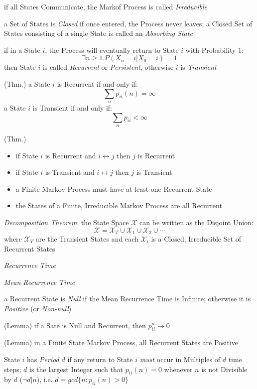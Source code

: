if all States Communicate, the Markof Process is called \emph{Irreducible}

a Set of States is \emph{Closed} if once entered, the Process never leaves; a
Closed Set of States consisting of a single State is called an \emph{Absorbing
  State}

if in a State $i$, the Process will eventually return to State $i$ with
Probability $1$:
\[
  \exists n \geq 1 . P(X_n = i | X_0 = i) = 1
\]
then State $i$ is called \emph{Recurrent} or \emph{Persistent}, otherwise $i$ is
\emph{Transient}

(Thm.) a State $i$ is Recurrent if and only if:
\[
  \sum_n p_{ii}(n) = \infty
\]
a State $i$ is Transient if and only if:
\[
  \sum_n p_{ii} < \infty
\]

(Thm.)
\begin{itemize}
  \item if State $i$ is Recurrent and $i \leftrightarrow j$ then $j$ is
    Recurrent
  \item if State $i$ is Transient and $i \leftrightarrow j$ then $j$ is
    Transient
  \item a Finite Markov Process must have at least one Recurrent State
  \item the States of a Finite, Irreducible Markov Process are all Recurrent
\end{itemize}

\emph{Decomposition Theorem}:
the State Space $\mathcal{X}$ can be written as the Disjoint Union:
\[
  \mathcal{X} = \mathcal{X}_T \cup \mathcal{X}_1 \cup \mathcal{X}_2 \cup \cdots
\]
where $\mathcal{X}_T$ are the Transient States and each $\mathcal{X}_i$ is a
Closed, Irreducible Set of Recurrent States

\emph{Recurrence Time}

\emph{Mean Recurrence Time}

a Recurrent State is \emph{Null} if the Mean Recurrence Time is Infinite;
otherwise it is \emph{Positive} (or \emph{Non-null})

(Lemma) if a Sate is Null and Recurrent, then $p_{ii}^n \rightarrow 0$

(Lemma) in a Finite State Markov Process, all Recurrent States are Positive

State $i$ has \emph{Period} $d$ if any return to State $i$ \emph{must} occur in
Multiples of $d$ time steps; $d$ is the largest Integer such that
$p_{ii}(n) = 0$ whenever $n$ is not Divisible by $d$ ($\neg d | n$), i.e.
$d = gcd\{n : p_{ii}(n) > 0 \}$


